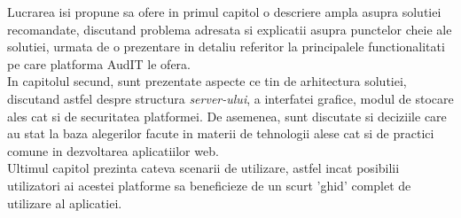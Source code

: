 Lucrarea isi propune sa ofere in primul capitol o descriere ampla asupra solutiei recomandate, discutand problema adresata si explicatii asupra punctelor cheie ale solutiei, urmata de o prezentare in detaliu referitor la principalele functionalitati pe care platforma AudIT le ofera.\\
In capitolul secund, sunt prezentate aspecte ce tin de arhitectura solutiei, discutand astfel despre structura \textit{server-ului}, a interfatei grafice, modul de stocare ales cat si de securitatea platformei. De asemenea, sunt discutate si deciziile care au stat la baza alegerilor facute in materii de tehnologii alese cat si de practici comune in dezvoltarea aplicatiilor  web.\\
Ultimul capitol prezinta cateva scenarii de utilizare, astfel incat posibilii utilizatori ai acestei platforme sa beneficieze de un scurt 'ghid' complet  de utilizare al aplicatiei.


   

